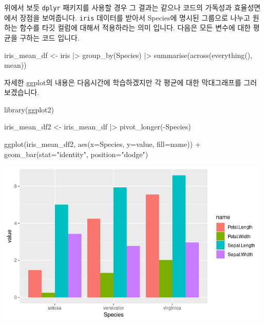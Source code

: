 \documentclass[
  a4paper,
]{book}
\newenvironment{Shaded}{\begin{snugshade}}{\end{snugshade}}
\newcommand{\AttributeTok}[1]{\textcolor[rgb]{0.40,0.45,0.13}{#1}}
\newcommand{\FunctionTok}[1]{\textcolor[rgb]{0.28,0.35,0.67}{#1}}
\newcommand{\NormalTok}[1]{\textcolor[rgb]{0.00,0.23,0.31}{#1}}
\newcommand{\OtherTok}[1]{\textcolor[rgb]{0.00,0.23,0.31}{#1}}
\newcommand{\SpecialCharTok}[1]{\textcolor[rgb]{0.37,0.37,0.37}{#1}}
\newcommand{\StringTok}[1]{\textcolor[rgb]{0.13,0.47,0.30}{#1}}
\begin{document}
위에서 보듯 \texttt{dplyr} 패키지를 사용할 경우 그 결과는 같으나 코드의
가독성과 효율성면에서 장점을 보여줍니다. \texttt{iris} 데이터를 받아서
Species에 명시된 그룹으로 나누고 원하는 함수를 타깃 컬럼에 대해서
적용하라는 의미 입니다. 다음은 모든 변수에 대한 평균을 구하는 코드
입니다.

\begin{Shaded}
\begin{Highlighting}[]
\NormalTok{iris\_mean\_df }\OtherTok{\textless{}{-}}\NormalTok{ iris }\SpecialCharTok{|\textgreater{}} 
  \FunctionTok{group\_by}\NormalTok{(Species) }\SpecialCharTok{|\textgreater{}} 
  \FunctionTok{summarise}\NormalTok{(}\FunctionTok{across}\NormalTok{(}\FunctionTok{everything}\NormalTok{(), mean))}
\end{Highlighting}
\end{Shaded}

자세한 ggplot의 내용은 다음시간에 학습하겠지만 각 평균에 대한
막대그래프를 그러보겠습니다.

\begin{Shaded}
\begin{Highlighting}[]
\FunctionTok{library}\NormalTok{(ggplot2)}

\NormalTok{iris\_mean\_df2 }\OtherTok{\textless{}{-}}\NormalTok{ iris\_mean\_df }\SpecialCharTok{|\textgreater{}} 
  \FunctionTok{pivot\_longer}\NormalTok{(}\SpecialCharTok{{-}}\NormalTok{Species)}

\FunctionTok{ggplot}\NormalTok{(iris\_mean\_df2, }\FunctionTok{aes}\NormalTok{(}\AttributeTok{x=}\NormalTok{Species, }\AttributeTok{y=}\NormalTok{value, }\AttributeTok{fill=}\NormalTok{name)) }\SpecialCharTok{+}
  \FunctionTok{geom\_bar}\NormalTok{(}\AttributeTok{stat=}\StringTok{"identity"}\NormalTok{, }\AttributeTok{position=}\StringTok{"dodge"}\NormalTok{)}
\end{Highlighting}
\end{Shaded}

\includegraphics[width=5.20833in,height=\textheight]{images/08/Rplot01.png}
\end{document}
